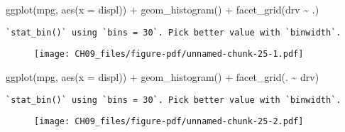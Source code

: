 \documentclass[
  letterpaper,
  DIV=11,
  numbers=noendperiod]{scrreprt}
\newenvironment{Shaded}{\begin{snugshade}}{\end{snugshade}}
\newcommand{\AttributeTok}[1]{\textcolor[rgb]{0.40,0.45,0.13}{#1}}
\newcommand{\FunctionTok}[1]{\textcolor[rgb]{0.28,0.35,0.67}{#1}}
\newcommand{\NormalTok}[1]{\textcolor[rgb]{0.00,0.23,0.31}{#1}}
\newcommand{\SpecialCharTok}[1]{\textcolor[rgb]{0.37,0.37,0.37}{#1}}
\begin{document}
\begin{enumerate}
  \begin{tcolorbox}[enhanced jigsaw, left=2mm, rightrule=.15mm, bottomtitle=1mm, opacitybacktitle=0.6, leftrule=.75mm, opacityback=0, colframe=quarto-callout-note-color-frame, bottomrule=.15mm, coltitle=black, toptitle=1mm, colback=white, titlerule=0mm, colbacktitle=quarto-callout-note-color!10!white, title={Answer}, toprule=.15mm, breakable, arc=.35mm]

\begin{Shaded}
\begin{Highlighting}[]
\FunctionTok{ggplot}\NormalTok{(mpg, }\FunctionTok{aes}\NormalTok{(}\AttributeTok{x =}\NormalTok{ displ)) }\SpecialCharTok{+} 
  \FunctionTok{geom\_histogram}\NormalTok{() }\SpecialCharTok{+} 
  \FunctionTok{facet\_grid}\NormalTok{(drv }\SpecialCharTok{\textasciitilde{}}\NormalTok{ .)}
\end{Highlighting}
\end{Shaded}

\begin{verbatim}
`stat_bin()` using `bins = 30`. Pick better value with `binwidth`.
\end{verbatim}

  \begin{figure}[H]

  {\centering \texttt{[image: CH09\_files/figure-pdf/unnamed-chunk-25-1.pdf]}

  }

  \end{figure}

\begin{Shaded}
\begin{Highlighting}[]
\FunctionTok{ggplot}\NormalTok{(mpg, }\FunctionTok{aes}\NormalTok{(}\AttributeTok{x =}\NormalTok{ displ)) }\SpecialCharTok{+} 
  \FunctionTok{geom\_histogram}\NormalTok{() }\SpecialCharTok{+}
  \FunctionTok{facet\_grid}\NormalTok{(. }\SpecialCharTok{\textasciitilde{}}\NormalTok{ drv)}
\end{Highlighting}
\end{Shaded}

\begin{verbatim}
`stat_bin()` using `bins = 30`. Pick better value with `binwidth`.
\end{verbatim}

  \begin{figure}[H]

  {\centering \texttt{[image: CH09\_files/figure-pdf/unnamed-chunk-25-2.pdf]}

  }


\end{figure}
\end{tcolorbox}
\end{enumerate}
\end{document}
